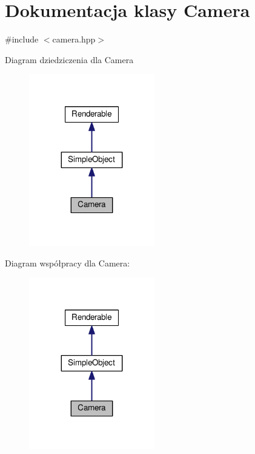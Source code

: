 \hypertarget{class_camera}{}\section{Dokumentacja klasy Camera}
\label{class_camera}


{\ttfamily \#include $<$camera.\+hpp$>$}



Diagram dziedziczenia dla Camera
\nopagebreak
\begin{figure}[H]
\begin{center}
\leavevmode
\includegraphics[width=155pt]{class_camera__inherit__graph}
\end{center}
\end{figure}


Diagram współpracy dla Camera\+:
\nopagebreak
\begin{figure}[H]
\begin{center}
\leavevmode
\includegraphics[width=155pt]{class_camera__coll__graph}
\end{center}
\end{figure}
